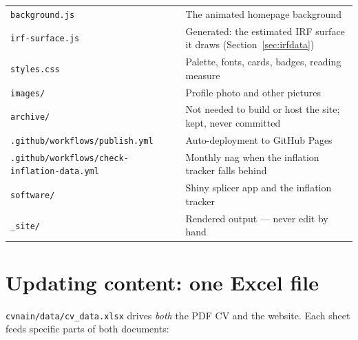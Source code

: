 \documentclass[11pt,a4paper]{article}
\newcommand{\file}[1]{\texttt{#1}}
\begin{document}
\begin{center}
\begin{tabular}{@{}ll@{}}
\file{background.js}           & The animated homepage background \\
\file{irf-surface.js}          & Generated: the estimated IRF surface it draws (Section~\ref{sec:irfdata}) \\
\file{styles.css}              & Palette, fonts, cards, badges, reading measure \\
\file{images/}                 & Profile photo and other pictures \\
\file{archive/}                & Not needed to build or host the site; kept, never committed \\
\file{.github/workflows/publish.yml} & Auto-deployment to GitHub Pages \\
\file{.github/workflows/check-inflation-data.yml} & Monthly nag when the inflation tracker falls behind \\
\file{software/}               & Shiny splicer app and the inflation tracker \\
\file{\_site/}                 & Rendered output --- never edit by hand \\
\bottomrule
\end{tabular}
\end{center}

\section{Updating content: one Excel file}

\file{cvnain/data/cv\_data.xlsx} drives \emph{both} the PDF CV and the
website. Each sheet feeds specific parts of both documents:
\end{document}
